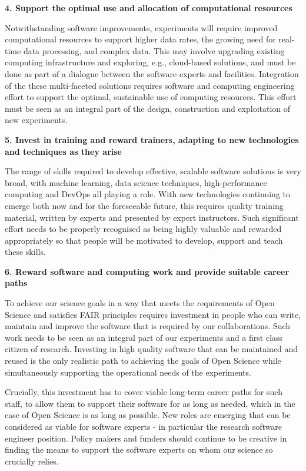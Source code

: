 {\bf 4. Support the optimal use and allocation of computational resources}

Notwithstanding software improvements, experiments will require improved computational resources to support higher data rates, the growing need for real-time data processing, and complex data. This may involve upgrading existing computing infrastructure and exploring, e.g., cloud-based solutions, and must be done as part of a dialogue between the software experts and facilities. Integration of the these multi-faceted solutions requires software and computing engineering effort to support the optimal, sustainable use of computing resources. This effort must be seen as an integral part of the design, construction and exploitation of new experiments.

{\bf 5. Invest in training and reward trainers, adapting to new technologies and techniques as they arise}

The range of skills required to develop effective, scalable software solutions is very broad, with machine learning, data science techniques, high-performance computing and DevOps all playing a role. With new technologies continuing to emerge both now and for the foreseeable future, this requires quality training material, written by experts and presented by expert instructors. Such significant effort needs to be properly recognised as being highly valuable and rewarded appropriately so that people will be motivated to develop, support and teach these skills.

{\bf 6. Reward software and computing work and provide suitable career paths}

To achieve our science goals in a way that meets the requirements of Open Science and satisfies FAIR principles requires investment in people who can write, maintain and improve the software that is required by our collaborations. Such work needs to be seen as an integral part of our experiments and a first class citizen of research.  Investing in high quality software that can be maintained and reused is the only realistic path to achieving the goals of Open Science while simultaneously supporting the operational needs of the experiments.

Crucially, this investment has to cover viable long-term career paths for such staff, to allow them to support their software for as long as needed, which in the case of Open Science is as long as possible.
New roles are emerging that can be considered as viable for software experts - in particular the research software engineer position. Policy makers and funders should continue to be creative in finding the means to support the software experts on whom our science so crucially relies.
